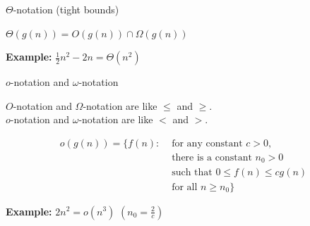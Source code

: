 \documentclass{beamer}
\begin{document}
\begin{frame}{$\Theta$-notation (tight bounds)}
    \begin{tcolorbox}
        $\Theta(g(n)) = O(g(n)) \cap \Omega(g(n))$
    \end{tcolorbox}
    \begin{exampleblock}{\textbf{Example:}}
        \vspace{2mm}
        $ \frac{1}{2}n^2 - 2n = \Theta(n^2) $
    \end{exampleblock}
\end{frame}

\begin{frame}{$o$-notation and $\omega$-notation}
    \begin{block}{}
        $O$-notation and $\Omega$-notation are like $\leq$ and $\geq$.\\
        $o$-notation and $\omega$-notation are like $<$ and $>$.
    \end{block}
    \begin{tcolorbox}
        \begin{align*}
            o(g(n)) = \{ f(n):  & \text{ for any constant } c > 0, \\
                                                   & \text{ there is a constant } n_0 > 0 \\
                                                   & \text{ such that } 0 \leq f(n) \leq cg(n) \\
                                                   & \text{ for all } n \geq n_0\}
        \end{align*}
    \end{tcolorbox}
    \begin{exampleblock}{\textbf{Example:}}
        \vspace{2mm}
        $ 2n^2 = o(n^3) $ \hspace{5mm} $(n_0 = \frac{2}{c})$
    \end{exampleblock}
\end{frame}
\end{document}

